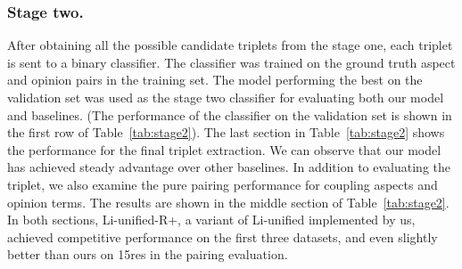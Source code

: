 \documentclass[letterpaper]{article} \usepackage{aaai20}  \usepackage{times}  \usepackage{helvet} \usepackage{courier}  \usepackage[hyphens]{url}  \usepackage{graphicx} \urlstyle{rm} \def\UrlFont{\rm}  \usepackage{graphicx}  \frenchspacing  \setlength{\pdfpagewidth}{8.5in}  \setlength{\pdfpageheight}{11in}
\begin{document}



\subsubsection{Stage two.}
After obtaining all the possible candidate triplets from the stage one, each triplet is sent to a binary classifier. The classifier was trained on the ground truth aspect and opinion pairs in the training set. 
The model performing the best on the validation set was used as the stage two classifier for evaluating both our model and baselines. (The performance of the classifier on the validation set is shown in the first row of Table~\ref{tab:stage2}). 
The last section in Table~\ref{tab:stage2} shows the performance for the final triplet extraction. We can observe that our model has achieved steady advantage over other baselines. In addition to evaluating the triplet, we also examine the pure pairing performance for coupling aspects and opinion terms. The results are shown in the middle section of Table~\ref{tab:stage2}. In both sections, Li-unified-R+, a variant of Li-unified implemented by us, achieved competitive performance on the first three datasets, and even slightly better than ours on 15res in the pairing evaluation.
\end{document}

